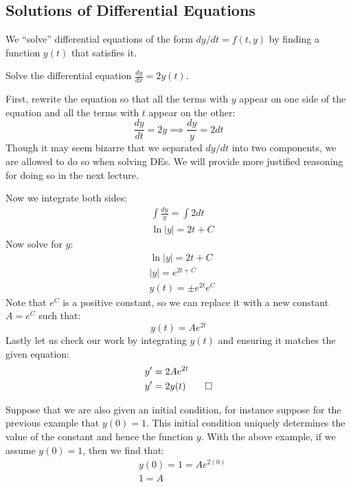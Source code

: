 \subsection{Solutions of Differential Equations}

We ``solve'' differential equations of the form $dy/dt = f(t, y)$ by finding a function $y(t)$ that satisfies it.

\begin{example}
    Solve the differential equation $\frac{dy}{dx} = 2y(t)$.
\end{example}
\begin{solution}
    First, rewrite the equation so that all the terms with $y$ appear on one side of the equation and all the terms with $t$ appear on the other:
    \[\frac{dy}{dt} = 2y \implies \frac{dy}{y} = 2dt\]
    Though it may seem bizarre that we separated $dy/dt$ into two components, we are allowed to do so when solving DEs. We will provide more justified reasoning for doing so in the next lecture.
    
    Now we integrate both sides:
    \begin{align*}
    & \int \frac{dy}{y} = \int 2dt \\
    & \ln|y| = 2t + C
    \end{align*}
    Now solve for $y$:
    \begin{align*}
    & \ln|y| = 2t + C \\
    & |y| = e^{2t + C} \\
    &  y(t) = \pm e^{2t}e^C
    \end{align*}
    Note that $e^C$ is a positive constant, so we can replace it with a new constant $A = e^C$ such that:
    \[ y(t) = Ae^{2t} \]
    Lastly let us check our work by integrating $y(t)$ and ensuring it matches the given equation:
    \begin{align*}
    & y' = 2Ae^{2t} \\
    & y' = 2y(t)  \qedhere
    \end{align*}
\end{solution}

Suppose that we are also given an initial condition, for instance suppose for the previous example that $y(0) = 1$. This initial condition uniquely determines the value of the constant and hence the function $y$. With the above example, if we assume $y(0) = 1$, then we find that:
\begin{align*}
    & y(0) = 1 = Ae^{2(0)} \\
    & 1 = A
\end{align*}

